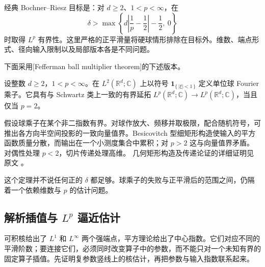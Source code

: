 经典 Bochner–Riesz 目标是：对 \(d\ge2\)、\(1<p<\infty\)，在
\[
 \delta>\max\left\{d\left|\frac1p-\frac12\right|-\frac12,\ 0\right\}
\]
时取得 \(L^p\) 有界性。这里严格的正平滑量将硬球情形排除在目标外。维数、端点形式、径向输入限制以及局部版本各是不同问题。

\ProseParagraphBreak

下面采用[Fefferman ball multiplier theorem]的下述版本。

\begin{theorem}\label{b2:thm:24-fefferman}
设整数 \(d\geq2\)，\(1<p<\infty\)。在 \(L^2(\mathbb R^d;\mathbb C)\) 上以符号
\(\mathbf1_{\{\,|\xi|<1\,\}}\) 定义单位球 Fourier 乘子。它具有与 Schwartz 类上一致的有界延拓
\(L^p(\mathbb R^d;\mathbb C)\to L^p(\mathbb R^d;\mathbb C)\)，当且仅当 \(p=2\)。
\end{theorem}
\begin{proofsketch}
假设球乘子在某个非二指数有界。对球作放大、频移并取极限，配合随机符号，可推出各方向半空间投影的一致向量值界。Besicovitch 型细矩形构造使输入的平方函数质量分散，而输出在一个小测度集合中累积；对 \(p>2\) 这与向量值界矛盾。对偶性处理 \(p<2\)，切片传递处理高维。
几何矩形构造及传递论证的详细证明见原文
\cite[Theorem 1; Section 2, pp.~330--336]{Fefferman1971Ball}。
\end{proofsketch}
这个定理并不说任何正的 \(\delta\) 都足够。球乘子的失败与正平滑后的范围之间，仍隔着一个依赖维数与 \(p\) 的估计问题。

\subsection{解析插值与 \texorpdfstring{\(L^p\)}{Lᵖ} 逼近估计}
\label{b2:subsec:240304}

可积核给出了 \(L^1\) 和 \(L^\infty\) 两个强端点，平方理论给出了中心指数。它们对应不同的平滑阶数；要连接它们，必须同时改变算子中的参数，而不能只对一个未知有界的固定算子插值。先证明复参数竖线上的核估计，再把参数与输入指数联系起来。

